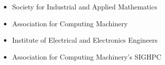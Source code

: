 \begin{itemize} 
\item Society for Industrial and Applied Mathematics 
\item Association for Computing Machinery
\item Institute of Electrical and Electronics Engineers
\item Association for Computing Machinery's SIGHPC
\end{itemize}
